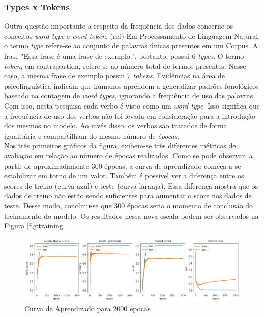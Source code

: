 \subsubsection{Types x Tokens}
Outra questão importante a respeito da frequência dos dados concerne os conceitos \textit{word type} e \textit{word token}. (ref) %
Em Processamento de Linguagem Natural, o termo \textit{type} refere-se ao conjunto de palavras únicas presentes em um Corpus. A frase "Essa frase é uma frase de exemplo.", portanto, possui 6 \textit{types}. O termo \textit{token}, em contrapartida, refere-se ao número total de termos presentes. Nesse caso, a mesma frase de exemplo possui 7 \textit{tokens}. Evidências na área de psicolinguística \cite{Bybee:1995,janet:2018} indicam que humanos aprendem a generalizar padrões fonológicos baseado na contagem de \textit{word types}, ignorando a frequência de uso das palavras. Com isso, nesta pesquisa cada verbo é visto como um \textit{word type}. Isso significa que a frequência de uso dos verbos não foi levada em consideração para a introdução dos mesmos no modelo. Ao invés disso, os verbos são tratados de forma igualitária e compartilham do mesmo número de \textit{épocas}.\\


Nos três primeiros gráficos da figura, exibem-se três diferentes métricas de avaliação em relação ao número de épocas realizadas. 
Como se pode observar, a partir de aproximadamente 300 épocas, a curva de aprendizado começa a se estabilizar em torno de um valor. Também é possível ver a diferença entre os scores de treino (curva azul) e teste (curva laranja). Essa diferença mostra que os dados de treino não estão sendo suficientes para aumentar o score nos dados de teste. Desse modo, concluiu-se que 300 épocas seria o momento de conclusão do treinamento do modelo. Os resultados nessa nova escala podem ser observados na Figura \ref{fig:training}.  

\begin{figure}[H]
  \centering
  \includegraphics[width=1.0\linewidth]{img/2000_precision.png}
  \caption{Curva de Aprendizado para 2000 épocas}
  \label{fig:training2000}
\end{figure}


